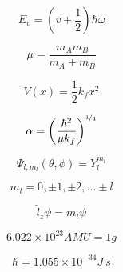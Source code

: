 \documentclass[12pt, letterpaper]{memoir}
\begin{document}
		\begin{minipage}{0.495\textwidth}	
		
			\begin{equation*}
				E_v = \left(v+\frac{1}{2}\right) \hbar\omega
			\end{equation*}
			
			\begin{equation*}
				\mu=\frac{m_Am_B}{m_A+m_B}
			\end{equation*}
			
			\begin{equation*}
				V(x)=\frac{1}{2}k_fx^2
			\end{equation*}
		
		\begin{equation*}
			\alpha = \left(\dfrac{\hbar^2}{\mu k_f}\right)^{\nicefrac{1}{4}}
		\end{equation*}		
			
			\begin{equation*}
				\Psi_{l,m_l}(\theta, \phi)=Y_l^{m_l}
			\end{equation*}
			
			\begin{equation*}
				m_l = 0, \pm1, \pm2, \ldots \pm l
			\end{equation*}
						
			\begin{equation*}
			\hat{l}_z\psi=m_l\psi
			\end{equation*}
			
			\begin{equation*}
				6.022\times10^{23}AMU=1g
			\end{equation*}
		
			\begin{equation*}
				\hbar = 1.055\times10^{-34}J~s
			\end{equation*}
			
		\end{minipage}
%
%			
\end{document}
